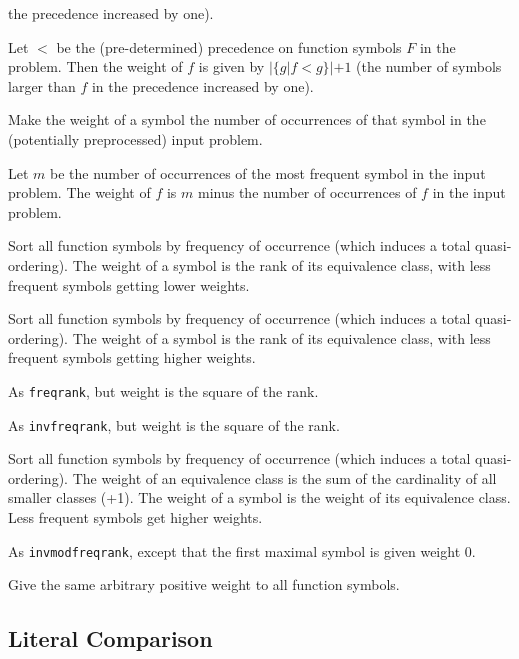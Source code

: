 \documentclass{report}
\begin{document}
\begin{description}
  the precedence increased by one).
\item[\texttt{invprecedence}:] Let $<$ be the (pre-determined)
  precedence on function symbols $F$ in the problem. Then the weight
  of $f$ is given by $|\{g|f<g\}|+1$ (the number of symbols larger than
  $f$ in the precedence increased by one).
\item[\texttt{freqcount}:] Make the weight of a symbol the number of
  occurrences of that symbol in the (potentially preprocessed) input
  problem.
\item[\texttt{invfreqcount}:]  Let $m$ be the number of occurrences of
  the most frequent symbol in the input problem. The weight of $f$ is
  $m$ minus the number of occurrences of $f$ in the input problem.
\item[\texttt{freqrank}:] Sort all function symbols by frequency of
  occurrence (which induces a total quasi-ordering). The weight of a
  symbol is the rank of its equivalence class, with less frequent
  symbols getting lower weights.
\item[\texttt{invfreqrank}:] Sort all function symbols by frequency of
  occurrence (which induces a total quasi-ordering). The weight of a
  symbol is the rank of its equivalence class, with less frequent
  symbols getting higher weights.
\item[\texttt{freqranksquare}:] As \texttt{freqrank}, but weight is
  the square of the rank.
\item[\texttt{invfreqranksquare}:] As \texttt{invfreqrank}, but weight is
  the square of the rank.
\item[\texttt{invmodfreqrank}:] Sort all function symbols by frequency of
  occurrence (which induces a total quasi-ordering). The weight of an
  equivalence class is the sum of the cardinality of all smaller
  classes (+1). The weight of a symbol is the weight of its
  equivalence class. Less frequent symbols get higher weights.
\item[\texttt{invmodfreqrankmax0}:] As \texttt{invmodfreqrank}, except
  that the first maximal symbol is given weight 0.
\item[\texttt{constant}:] Give the same arbitrary positive weight to
  all function symbols.
\end{description}

\subsection{Literal Comparison}
\label{sec:options:litcmp}
\end{document}
